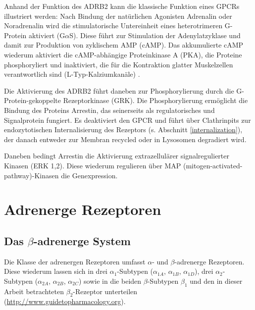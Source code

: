 Anhand der Funktion des ADRB2 kann die klassische Funktion eines GPCRs illustriert werden: Nach Bindung der natürlichen Agonisten Adrenalin oder Noradrenalin wird die stimulatorische Untereinheit eines heterotrimeren G-Protein aktiviert (G$\alpha$S). Diese führt zur Stimulation der Adenylatzyklase und damit zur Produktion von zyklischem AMP (cAMP). Das akkumulierte cAMP wiederum aktiviert die cAMP-abhängige Proteinkinase A (PKA), die Proteine phosphoryliert und inaktiviert, die für die Kontraktion glatter Muskelzellen verantwortlich sind (L-Typ-Kalziumkanäle) \parencite{Hoffman1982}. 

Die Aktivierung des ADRB2 führt daneben zur Phosphorylierung durch die G-Protein-gekoppelte Rezeptorkinase (GRK). Die Phosphorylierung ermöglicht die Bindung des Proteins Arrestin, das seinerseits als regulatorisches und Signalprotein fungiert. Es deaktiviert den GPCR und führt über Clathrinpits zur endozytotischen Internalisierung des Rezeptors (s. Abschnitt \ref{internalization}), der danach entweder zur Membran recycled oder in Lysosomen degradiert wird. 

Daneben bedingt Arrestin die Aktivierung extrazellulärer signalregulierter Kinasen (ERK 1,2). Diese wiederum regulieren über MAP (mitogen-activated-pathway)-Kinasen die Genexpression.

\section{Adrenerge Rezeptoren}
\subsection{Das $\beta$-adrenerge System}
Die Klasse der adrenergen Rezeptoren umfasst $\alpha$- und $\beta$-adrenerge Rezeptoren. Diese wiederum lassen sich in drei $\alpha_1$-Subtypen ($\alpha_{1A}$, $\alpha_{1B}$, $\alpha_{1D}$), drei $\alpha_2$-Subtypen ($\alpha_{2A}$, $\alpha_{2B}$, $\alpha_{2C}$) sowie in die beiden $\beta$-Subtypen $\beta_1$ und den in dieser Arbeit betrachteten $\beta_2$-Rezeptor unterteilen (\url{http://www.guidetopharmacology.org}).

